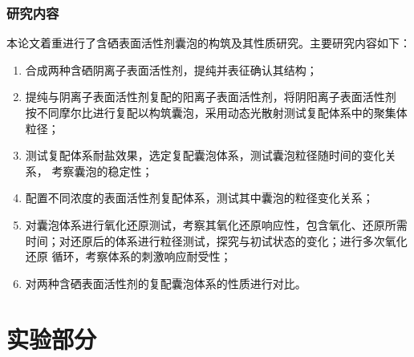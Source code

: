 \documentclass[bachelor,fandolfonts,replaceperiod]{jnuthesis}
\begin{document}
    \subsection{研究内容}
    本论文着重进行了含硒表面活性剂囊泡的构筑及其性质研究。主要研究内容如下：
    \begin{enumerate}
        \item 合成两种含硒阴离子表面活性剂，提纯并表征确认其结构；
        \item 提纯与阴离子表面活性剂复配的阳离子表面活性剂，将阴阳离子表面活性剂
        按不同摩尔比进行复配以构筑囊泡，采用动态光散射测试复配体系中的聚集体粒径；
        \item 测试复配体系耐盐效果，选定复配囊泡体系，测试囊泡粒径随时间的变化关系，
        考察囊泡的稳定性；
        \item 配置不同浓度的表面活性剂复配体系，测试其中囊泡的粒径变化关系；
        \item 对囊泡体系进行氧化还原测试，考察其氧化还原响应性，包含氧化、还原所需
        时间；对还原后的体系进行粒径测试，探究与初试状态的变化；进行多次氧化还原
        循环，考察体系的刺激响应耐受性；
        \item 对两种含硒表面活性剂的复配囊泡体系的性质进行对比。
    \end{enumerate}
    
    \chapter{实验部分}\label{chapter:experiment}
\end{document}
